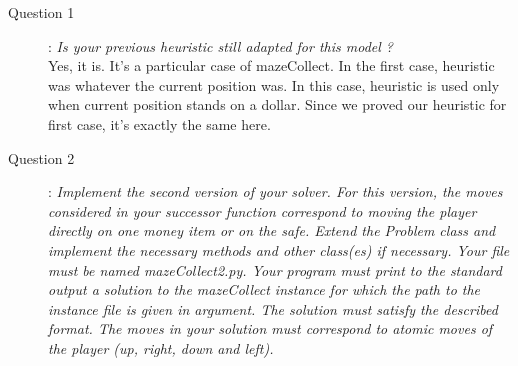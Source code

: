 \begin{description}
\item[Question 1]: \textit{Is your previous heuristic still adapted for this model ? }\\

Yes, it is. It's a particular case of mazeCollect. In the first case, heuristic was whatever the current position was. In this case, heuristic is used only when current position stands on a dollar. Since we proved our heuristic for first case, it's exactly the same here.

\item[Question 2]: \textit{Implement the second version of your solver. For this version, the moves considered in your successor function correspond to moving the player directly on one money item or on the safe. Extend the Problem class and implement the necessary methods and other class(es) if necessary. Your file must be named mazeCollect2.py. Your program must print to the standard output a solution to the mazeCollect instance for which the path to the instance file is given in argument. The solution must satisfy the described format. The moves in your solution must correspond to atomic moves of the player (up, right, down and left). }\\

\end{description}
 
